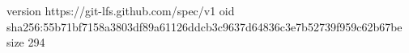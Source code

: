 version https://git-lfs.github.com/spec/v1
oid sha256:55b71bf7158a3803df89a61126ddcb3c9637d64836c3e7b52739f959c62b67be
size 294
